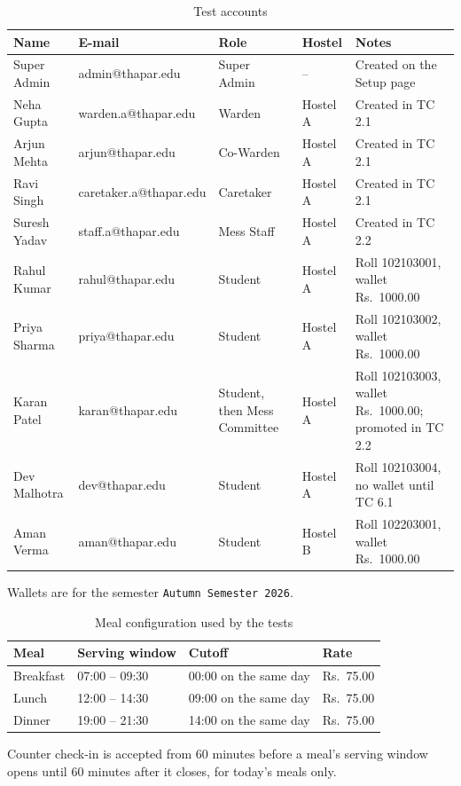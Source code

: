 \documentclass[11pt,a4paper]{article}
\begin{document}
\begin{table}[H]
\centering
\caption{Test accounts}
\label{tab:testdata}
\small
\begin{tabular}{@{}L{2.3cm}L{3.8cm}L{2.4cm}L{1.5cm}L{4.1cm}@{}}
\toprule
\textbf{Name} & \textbf{E-mail} & \textbf{Role} & \textbf{Hostel} & \textbf{Notes}\\
\midrule
Super Admin & admin@thapar.edu & Super Admin & -- & Created on the Setup page\\
Neha Gupta & warden.a@thapar.edu & Warden & Hostel A & Created in TC 2.1\\
Arjun Mehta & arjun@thapar.edu & Co-Warden & Hostel A & Created in TC 2.1\\
Ravi Singh & caretaker.a@thapar.edu & Caretaker & Hostel A & Created in TC 2.1\\
Suresh Yadav & staff.a@thapar.edu & Mess Staff & Hostel A & Created in TC 2.2\\
Rahul Kumar & rahul@thapar.edu & Student & Hostel A & Roll 102103001, wallet Rs.~1000.00\\
Priya Sharma & priya@thapar.edu & Student & Hostel A & Roll 102103002, wallet Rs.~1000.00\\
Karan Patel & karan@thapar.edu & Student, then Mess Committee & Hostel A & Roll 102103003, wallet Rs.~1000.00; promoted in TC 2.2\\
Dev Malhotra & dev@thapar.edu & Student & Hostel A & Roll 102103004, no wallet until TC 6.1\\
Aman Verma & aman@thapar.edu & Student & Hostel B & Roll 102203001, wallet Rs.~1000.00\\
\bottomrule
\end{tabular}
\par\smallskip\raggedright\footnotesize Wallets are for the semester \texttt{Autumn Semester 2026}.
\end{table}

\begin{table}[H]
\centering
\caption{Meal configuration used by the tests}
\label{tab:mealcfg}
\begin{tabular}{@{}llll@{}}
\toprule
\textbf{Meal} & \textbf{Serving window} & \textbf{Cutoff} & \textbf{Rate}\\
\midrule
Breakfast & 07:00 -- 09:30 & 00:00 on the same day & Rs.~75.00\\
Lunch & 12:00 -- 14:30 & 09:00 on the same day & Rs.~75.00\\
Dinner & 19:00 -- 21:30 & 14:00 on the same day & Rs.~75.00\\
\bottomrule
\end{tabular}
\par\smallskip\footnotesize Counter check-in is accepted from 60 minutes before a meal's serving
window opens until 60 minutes after it closes, for today's meals only.
\end{table}
\end{document}
